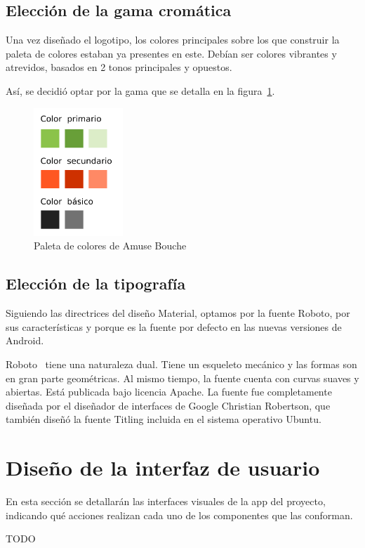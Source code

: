\subsection{Elección de la gama cromática}

Una vez diseñado el logotipo, los colores principales sobre los que construir
la paleta de colores estaban ya presentes en este. Debían ser colores vibrantes
y atrevidos, basados en 2 tonos principales y opuestos.

Así, se decidió optar por la gama que se detalla en la
figura~\ref{fig:paleta-colores}.

\begin{figure}[htbp]
  \centering
  \includegraphics[width=0.3\textwidth]{cap5/img/paleta_colores}
  \caption{Paleta de colores de Amuse Bouche}
  \label{fig:paleta-colores}
\end{figure}


\subsection{Elección de la tipografía}

Siguiendo las directrices del diseño Material, optamos por la fuente Roboto,
por sus características y porque es la fuente por defecto en las nuevas versiones
de Android.

Roboto~\cite{roboto-font} tiene una naturaleza dual. Tiene un esqueleto mecánico y
las formas son en gran parte geométricas. Al mismo tiempo, la fuente cuenta con
curvas suaves y abiertas. Está publicada bajo licencia Apache. La fuente fue
completamente diseñada por el diseñador de interfaces de Google Christian
Robertson, que también diseñó la fuente Titling incluida en el sistema operativo
Ubuntu. 


\section{Diseño de la interfaz de usuario}

En esta sección se detallarán las interfaces visuales de la app del proyecto,
indicando qué acciones realizan cada uno de los componentes que las conforman.

TODO
